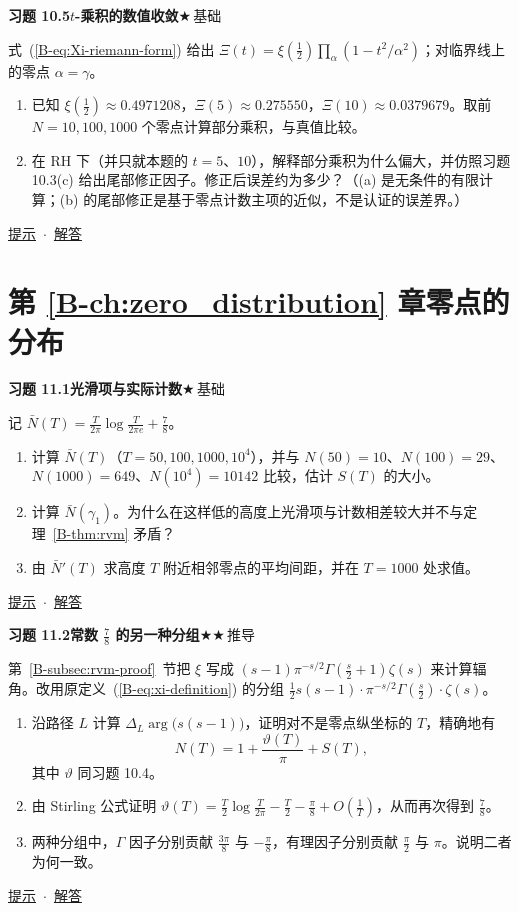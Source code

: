 \documentclass[11pt,a4paper]{article}
\newcommand{\bref}[1]{\ref*{B-#1}}
\newcommand{\lvI}{$\bigstar$\,基础}
\newcommand{\lvII}{$\bigstar\bigstar$\,推导}
\newcommand{\Q}[3]{%
  \par\addvspace{1.1em}\noindent
  \hypertarget{q:#1}{}\textbf{习题 #1}\quad\textbf{#3}\hfill{\small #2}\par
  \nopagebreak\smallskip}
\newcommand{\toHint}[1]{\hfill{\small\hyperlink{h:#1}{提示}\ $\cdot$\ \hyperlink{s:#1}{解答}}}
\begin{document}
\Q{10.5}{\lvI}{$t$-乘积的数值收敛}
式~(\bref{eq:Xi-riemann-form}) 给出 $\Xi(t)=\xi(\tfrac12)\prod_\alpha(1-t^2/\alpha^2)$；对临界线上的零点 $\alpha=\gamma$。
\begin{enumerate}
  \item 已知 $\xi(\tfrac12)\approx0.4971208$，$\Xi(5)\approx0.275550$，$\Xi(10)\approx0.0379679$。取前 $N=10,100,1000$ 个零点计算部分乘积，与真值比较。
  \item 在 RH 下（并只就本题的 $t=5$、$10$），解释部分乘积为什么偏大，并仿照习题 10.3(c) 给出尾部修正因子。修正后误差约为多少？（(a) 是无条件的有限计算；(b) 的尾部修正是基于零点计数主项的近似，不是认证的误差界。）
\end{enumerate}
\toHint{10.5}

\section*{第 \bref{ch:zero_distribution} 章\quad 零点的分布}
\addcontentsline{toc}{section}{\texorpdfstring{第 \protect\bref{ch:zero_distribution} 章\quad }{}零点的分布}

\Q{11.1}{\lvI}{光滑项与实际计数}
记 $\bar N(T)=\frac{T}{2\pi}\log\frac{T}{2\pi e}+\frac78$。
\begin{enumerate}
  \item 计算 $\bar N(T)$（$T=50,100,1000,10^4$），并与 $N(50)=10$、$N(100)=29$、$N(1000)=649$、$N(10^4)=10142$ 比较，估计 $S(T)$ 的大小。
  \item 计算 $\bar N(\gamma_1)$。为什么在这样低的高度上光滑项与计数相差较大并不与定理~\bref{thm:rvm} 矛盾？
  \item 由 $\bar N'(T)$ 求高度 $T$ 附近相邻零点的平均间距，并在 $T=1000$ 处求值。
\end{enumerate}
\toHint{11.1}

\Q{11.2}{\lvII}{常数 $\tfrac78$ 的另一种分组}
第~\bref{subsec:rvm-proof}~节把 $\xi$ 写成 $(s-1)\pi^{-s/2}\Gamma(\frac s2+1)\zeta(s)$ 来计算辐角。改用原定义~(\bref{eq:xi-definition}) 的分组 $\frac12s(s-1)\cdot\pi^{-s/2}\Gamma(\frac s2)\cdot\zeta(s)$。
\begin{enumerate}
  \item 沿路径 $L$ 计算 $\Delta_L\arg\bigl(s(s-1)\bigr)$，证明对不是零点纵坐标的 $T$，精确地有
  \[
    N(T)=1+\frac{\vartheta(T)}{\pi}+S(T),
  \]
  其中 $\vartheta$ 同习题 10.4。
  \item 由 Stirling 公式证明 $\vartheta(T)=\frac T2\log\frac T{2\pi}-\frac T2-\frac\pi8+O(\frac1T)$，从而再次得到 $\frac78$。
  \item 两种分组中，$\Gamma$ 因子分别贡献 $\frac{3\pi}8$ 与 $-\frac\pi8$，有理因子分别贡献 $\frac\pi2$ 与 $\pi$。说明二者为何一致。
\end{enumerate}
\toHint{11.2}
\end{document}
